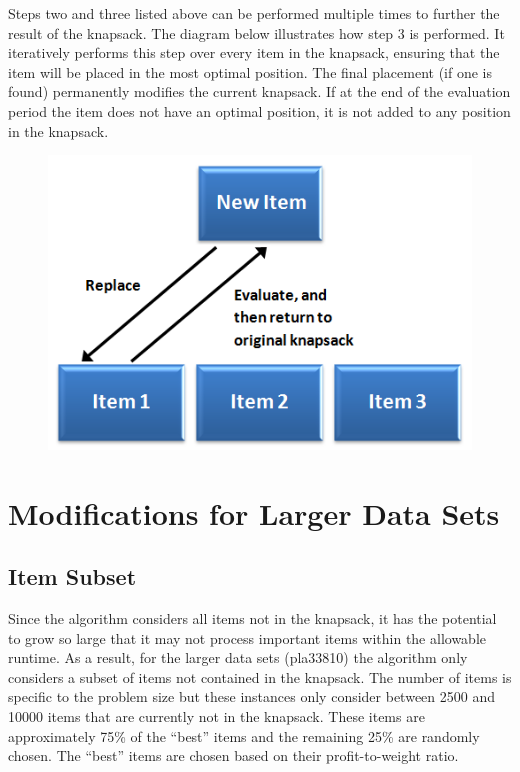 \documentclass[a4paper,12pt]{article}
\begin{document}
\newpage

Steps two and three listed above can be performed multiple times to further the result of the knapsack. The diagram below illustrates how step 3 is performed. It iteratively performs this step over every item in the knapsack, ensuring that the item will be placed in the most optimal position. The final placement (if one is found) permanently modifies the current knapsack. If at the end of the evaluation period the item does not have an optimal position, it is not added to any position in the knapsack.
\begin{figure}[h]
\centering
\includegraphics{ObsessivePacking.png}
\end{figure}

\section{Modifications for Larger Data Sets}
\subsection{Item Subset}
Since the algorithm considers all items not in the knapsack, it has the potential to grow so large that it may not process important items within the allowable runtime. As a result, for the larger data sets (pla33810) the algorithm only considers a subset of items not contained in the knapsack. The number of items is specific to the problem size but these instances only consider between 2500 and 10000 items that are currently not in the knapsack. These items are approximately 75\% of the ``best'' items and the remaining 25\% are randomly chosen. The ``best'' items are chosen based on their profit-to-weight ratio.
\end{document}

